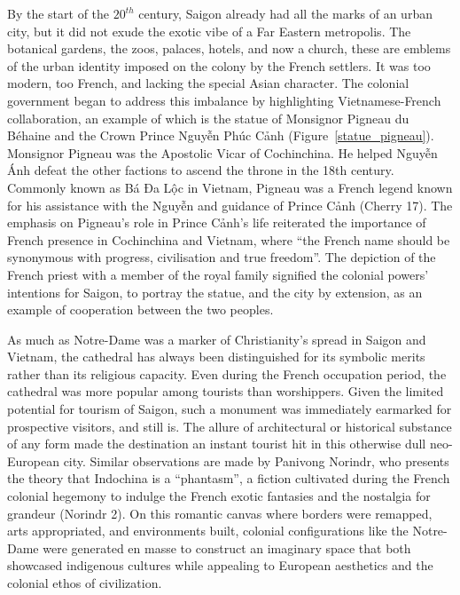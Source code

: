 \vi By the start of the $20^{th}$ century, Saigon already had all the marks of an urban city, but it did not exude the exotic vibe of a Far Eastern metropolis. The botanical gardens, the zoos, palaces, hotels, and now a church, these are emblems of the urban identity imposed on the colony by the French settlers. It was too modern, too French, and lacking the special Asian character. The colonial government began to address this imbalance by highlighting Vietnamese-French collaboration, an example of which is the statue of Monsignor Pigneau du Béhaine and the Crown Prince Nguyễn Phúc Cảnh (Figure~\ref{statue_pigneau}). Monsignor Pigneau was the Apostolic Vicar of Cochinchina. He helped Nguyễn Ánh defeat the other factions to ascend the throne in the 18th century. Commonly known as Bá Đa Lộc in Vietnam, Pigneau was a French legend known for his assistance with the Nguyễn and guidance of Prince Cảnh (Cherry 17). The emphasis on Pigneau's role in Prince Cảnh's life reiterated the importance of French presence in Cochinchina and Vietnam, where “the French name should be synonymous with progress, civilisation and true freedom”. The depiction of the French priest with a member of the royal family signified the colonial powers' intentions for Saigon, to portray the statue, and the city by extension, as an example of cooperation between the two peoples.

As much as Notre-Dame was a marker of Christianity’s spread in Saigon and Vietnam, the cathedral has always been distinguished for its symbolic merits rather than its religious capacity. Even during the French occupation period, the cathedral was more popular among tourists than worshippers.  Given the limited potential for tourism of Saigon, such a monument was immediately earmarked for prospective visitors, and still is. The allure of architectural or historical substance of any form made the destination an instant tourist hit in this otherwise dull neo-European city. Similar observations are made by Panivong Norindr, who presents the theory that Indochina is a “phantasm”, a fiction cultivated during the French colonial hegemony to indulge the French exotic fantasies and the nostalgia for grandeur (Norindr 2). On this romantic canvas where borders were remapped, arts appropriated, and environments built, colonial configurations like the Notre-Dame were generated en masse to construct an imaginary space that both showcased indigenous cultures while appealing to European aesthetics and the colonial ethos of civilization.

